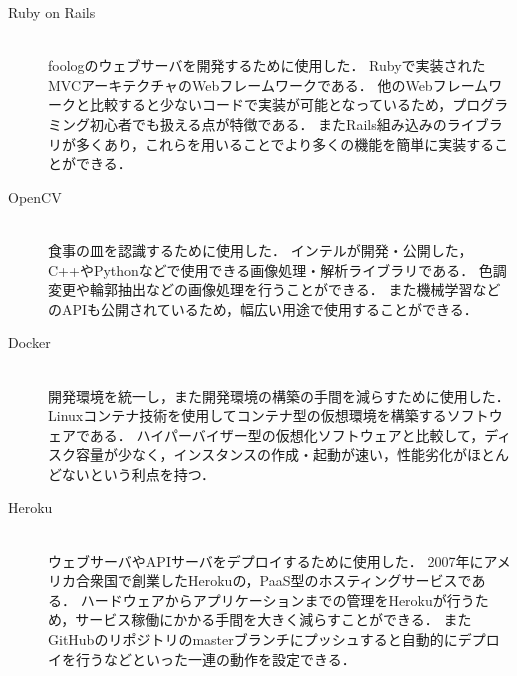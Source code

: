 \documentclass[../report]{subfiles}
\begin{document}
\begin{description}
    \item[Ruby on Rails] \mbox{} \\
        foologのウェブサーバを開発するために使用した．
        Rubyで実装されたMVCアーキテクチャのWebフレームワークである．
        他のWebフレームワークと比較すると少ないコードで実装が可能となっているため，プログラミング初心者でも扱える点が特徴である．
        またRails組み込みのライブラリが多くあり，これらを用いることでより多くの機能を簡単に実装することができる．

    \item[OpenCV] \mbox{} \\
        食事の皿を認識するために使用した．
        インテルが開発・公開した，C++やPythonなどで使用できる画像処理・解析ライブラリである．
        色調変更や輪郭抽出などの画像処理を行うことができる．
        また機械学習などのAPIも公開されているため，幅広い用途で使用することができる．

    \item[Docker] \mbox{} \\
        開発環境を統一し，また開発環境の構築の手間を減らすために使用した．
        Linuxコンテナ技術を使用してコンテナ型の仮想環境を構築するソフトウェアである．
        ハイパーバイザー型の仮想化ソフトウェアと比較して，ディスク容量が少なく，インスタンスの作成・起動が速い，性能劣化がほとんどないという利点を持つ．

    \item[Heroku] \mbox{} \\
        ウェブサーバやAPIサーバをデプロイするために使用した．
        2007年にアメリカ合衆国で創業したHerokuの，PaaS型のホスティングサービスである．
        ハードウェアからアプリケーションまでの管理をHerokuが行うため，サービス稼働にかかる手間を大きく減らすことができる．
        またGitHubのリポジトリのmasterブランチにプッシュすると自動的にデプロイを行うなどといった一連の動作を設定できる．
\end{description}
\end{document}
